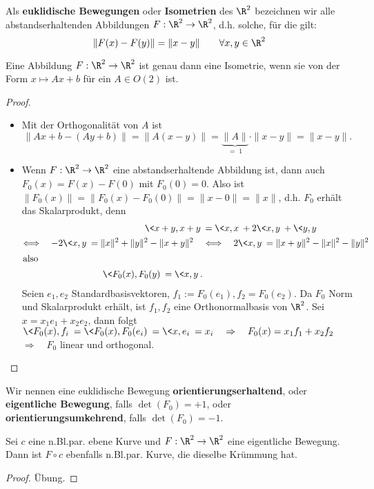 \documentclass{mycourse}
\begin{document}
\begin{df}
Als \textbf{euklidische Bewegungen} oder \textbf{Isometrien} des $\R^2$ bezeichnen wir alle abstandserhaltenden Abbildungen $F: \R^2 \to \R^2$, d.h. solche, für die gilt:
\[ \| F(x) - F(y) \| = \| x - y \| \qquad \forall x,y \in \R^2 \]
\end{df}

\begin{st}
Eine Abbildung $F: \R^2 \to \R^2$ ist genau dann eine Isometrie, wenn sie von der Form $x \mapsto Ax + b$ für ein $A \in O(2)$ ist.
\begin{proof}
\begin{itemize}
	\item Mit der Orthogonalität von $A$ ist \[ \| Ax+b - (Ay + b) \| = \| A(x-y) \| = \underbrace{\| A \|}_{ = \; 1} \cdot \| x - y \| = \| x - y \| .  \]
	\item
	Wenn $F:\R^2 \to \R^2$ eine abstandserhaltende Abbildung ist, dann auch $F_0(x) = F(x) - F(0)$ mit $F_0(0) = 0$. Also ist $\| F_0(x) \| = \| F_0(x) - F_0(0) \| = \| x - 0 \| = \| x\|$, d.h. $F_0$ erhält das Skalarprodukt, denn
	\begin{align*} \< x+y , x+y \> &= \< x,x \> + 2 \< x,y \> + \< y,y \>   \\
	\Longleftrightarrow \quad -2 \< x,y \> = \| x\|^2 + \| y\|^2 - \| x+y \|^2  \quad  &\Longleftrightarrow \quad 2 \< x,y \> =  \| x+y \|^2 - \| x\|^2 - \| y\|^2 \\
\intertext{also } \qquad \< F_0(x), F_0(y) \> = \< x,y \>.
	\end{align*}
	Seien $e_1, e_2$ Standardbasisvektoren, $f_1 := F_0(e_1), f_2 = F_0(e_2)$. Da $F_0$ Norm und Skalarprodukt erhält, ist $f_1, f_2$ eine Orthonormalbasis von $\R^2$. Sei $x = x_1 e_1 + x_2 e_2$, dann folgt $ \< F_0(x), f_i \> = \< F_0(x), F_0(e_i) \> = \< x, e_i \> = x_i \quad \Rightarrow \quad F_0(x) = x_1 f_1 + x_2 f_2$ \\ $ \Longrightarrow \quad F_0$ linear und orthogonal.
\end{itemize}
\end{proof}
\end{st}

\begin{df*}
Wir nennen eine euklidische Bewegung \textbf{orientierungserhaltend}, oder \textbf{eigentliche Bewegung}, falls $ \det(F_0) = + 1 $, oder \textbf{orientierungsumkehrend}, falls $ \det(F_0) = - 1 $.
\end{df*}

\begin{st}
\label{3.5}
Sei $c$ eine n.Bl.par. ebene Kurve und $F: \R^2 \to \R^2$ eine eigentliche Bewegung. Dann ist $F \circ c$ ebenfalls n.Bl.par. Kurve, die dieselbe Krümmung hat.
\begin{proof}
Übung.
\end{proof}
\end{st}
\end{document}
